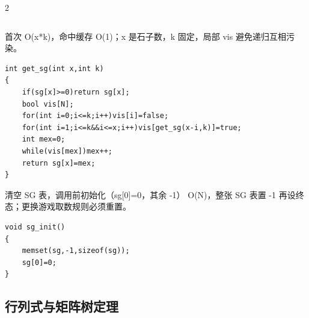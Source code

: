 \documentclass[UTF8,fontset=fandol,a4paper,twoside]{ctexart}
\newcommand{\note}[1]{{\fontsize{10}{12}\selectfont #1\par}}
\begin{document}
\begin{multicols}{2}
\begin{lstlisting}
\end{lstlisting}
\note{首次 O(\allowbreak{}x*k)\allowbreak{}，命中缓存 O(\allowbreak{}1)\allowbreak{}；x 是石子数，k 固定，局部 vis 避免递归互相污染。}
\begin{lstlisting}
int get_sg(int x,int k)
{
    if(sg[x]>=0)return sg[x];
    bool vis[N];
    for(int i=0;i<=k;i++)vis[i]=false;
    for(int i=1;i<=k&&i<=x;i++)vis[get_sg(x-i,k)]=true;
    int mex=0;
    while(vis[mex])mex++;
    return sg[x]=mex;
}
\end{lstlisting}
\note{清空 SG 表，调用前初始化（sg[\allowbreak{}0]\allowbreak{}=\allowbreak{}0，其余 -\allowbreak{}1） O(\allowbreak{}N)\allowbreak{}，整张 SG 表置 -\allowbreak{}1 再设终态；更换游戏取数规则必须重置。}
\begin{lstlisting}
void sg_init()
{
    memset(sg,-1,sizeof(sg));
    sg[0]=0;
}
\end{lstlisting}
\subsection{行列式与矩阵树定理}


\end{multicols}
\end{document}
